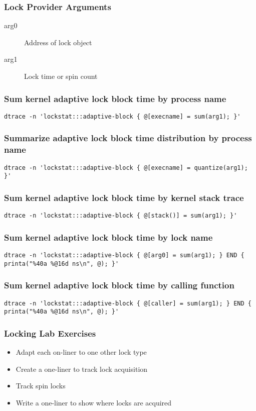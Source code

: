 \documentclass[pdftex]{beamer}
\begin{document}
\begin{frame}
  \frametitle{Lock Provider Arguments}
  \begin{description}
  \item[arg0] Address of lock object
  \item[arg1] Lock time or spin count
  \end{description}
\end{frame}

\begin{frame}[fragile]
  \frametitle{Sum kernel adaptive lock block time by process name}
\begin{verbatim}
dtrace -n 'lockstat:::adaptive-block { @[execname] = sum(arg1); }'
\end{verbatim}
\end{frame}

\begin{frame}[fragile]
\frametitle{Summarize adaptive lock block time distribution by process name}
\begin{verbatim}
dtrace -n 'lockstat:::adaptive-block { @[execname] = quantize(arg1); }'
\end{verbatim}
\end{frame}

\begin{frame}[fragile]
\frametitle{Sum kernel adaptive lock block time by kernel stack trace}
\begin{verbatim}
dtrace -n 'lockstat:::adaptive-block { @[stack()] = sum(arg1); }'
\end{verbatim}
\end{frame}

\begin{frame}[fragile]
\frametitle{Sum kernel adaptive lock block time by lock name}
\begin{verbatim}
dtrace -n 'lockstat:::adaptive-block { @[arg0] = sum(arg1); } END { printa("%40a %@16d ns\n", @); }'
\end{verbatim}  
\end{frame}

\begin{frame}[fragile]
\frametitle{Sum kernel adaptive lock block time by calling function}
\begin{verbatim}
dtrace -n 'lockstat:::adaptive-block { @[caller] = sum(arg1); } END { printa("%40a %@16d ns\n", @); }'
\end{verbatim}
\end{frame}

\begin{frame}
  \frametitle{Locking Lab Exercises}
  \begin{itemize}
  \item Adapt each on-liner to one other lock type
  \item Create a one-liner to track lock acquisition
  \item Track spin locks
  \item Write a one-liner to show where locks are acquired
  \end{itemize}
\end{frame}
\end{document}
